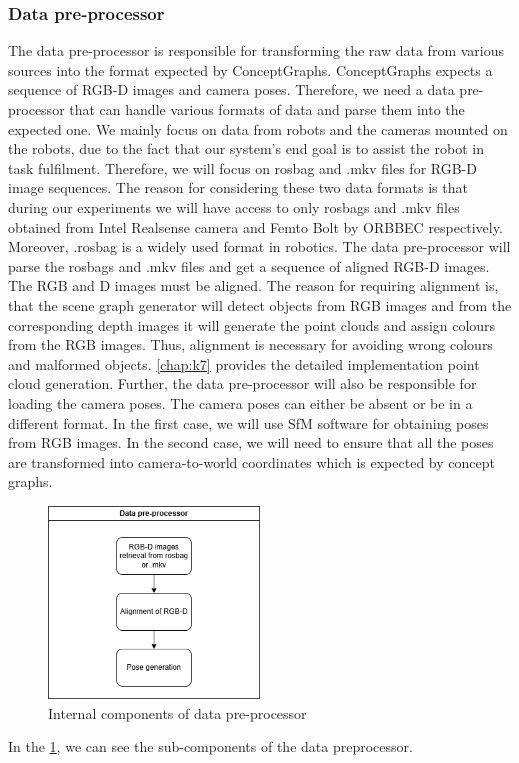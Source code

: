 \subsubsection{Data pre-processor}
The data pre-processor is responsible for transforming the raw data from various sources into the format expected by ConceptGraphs. 
ConceptGraphs expects a sequence of RGB-D images and camera poses. Therefore, we need a data pre-processor that can handle various formats of data
and parse them into the expected one.  We mainly focus on data from robots and the cameras mounted on the robots, due to the fact that our system's end goal 
is to assist the robot in task fulfilment. 
Therefore, we will focus on rosbag and .mkv files for RGB-D image sequences. The reason for considering these two data formats is that during our experiments
we will have access to only rosbags and .mkv files obtained from Intel Realsense camera and Femto Bolt by ORBBEC respectively. Moreover, .rosbag is a widely used format in robotics.
The data pre-processor will parse the rosbags and .mkv files  and get a sequence of aligned RGB-D images. 
The RGB and D images must be aligned. The reason for requiring alignment is, that the scene graph 
generator will detect objects from RGB images and from the corresponding depth images it will generate the point clouds and assign colours from 
the RGB images. Thus, alignment is necessary for avoiding wrong colours and malformed objects. \cref{chap:k7} provides the detailed 
implementation point cloud generation. 
Further, the data pre-processor will also be responsible for loading the camera poses. The camera poses can either be absent or be in 
a different format. In the first case, we will use SfM software for obtaining poses from RGB images. In the second case, we will need to
ensure that all the poses are transformed into camera-to-world coordinates which is expected by concept graphs.
\begin{figure}[ht!]
    \centering
    \includegraphics[width=0.5\textwidth]{content/images/DataPreProcessorDesign.png}
    \caption{Internal components of data pre-processor}
    \label{fig:dataPreprocessor}
\end{figure}
In the \cref{fig:dataPreprocessor}, we can see the sub-components of the data preprocessor.

